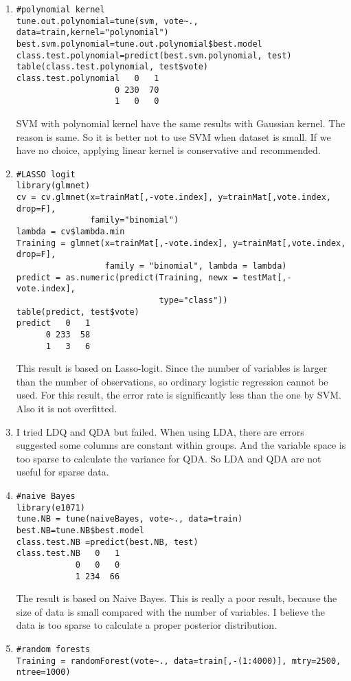 \documentclass[11pt,english]{article}
\begin{document}
\begin{enumerate}
\begin{enumerate}
\item
\begin{verbatim}
#polynomial kernel
tune.out.polynomial=tune(svm, vote~., data=train,kernel="polynomial")
best.svm.polynomial=tune.out.polynomial$best.model
class.test.polynomial=predict(best.svm.polynomial, test)
table(class.test.polynomial, test$vote)
class.test.polynomial   0   1
                    0 230  70
                    1   0   0
\end{verbatim}
SVM with polynomial kernel have the same results with Gaussian kernel.  The reason is same.  So it is better not to use SVM when dataset is small.  If we have no choice, applying linear kernel is conservative and recommended.
\item
\begin{verbatim}
#LASSO logit
library(glmnet)
cv = cv.glmnet(x=trainMat[,-vote.index], y=trainMat[,vote.index, drop=F],
               family="binomial")
lambda = cv$lambda.min
Training = glmnet(x=trainMat[,-vote.index], y=trainMat[,vote.index, drop=F],
                  family = "binomial", lambda = lambda)
predict = as.numeric(predict(Training, newx = testMat[,-vote.index],
                             type="class"))
table(predict, test$vote)
predict   0   1
      0 233  58
      1   3   6
\end{verbatim}
This result is based on Lasso-logit.  Since the number of variables is larger than the number of observations, so ordinary logistic regression cannot be used.  For this result, the error rate is significantly less than the one by SVM.   Also it is not overfitted.
\item
I tried LDQ and QDA but failed.  When using LDA, there are errors suggested some columns are constant within groups.  And the variable space is too sparse to calculate the variance for QDA.  So LDA and QDA are not useful for sparse data.
\item
\begin{verbatim}
#naive Bayes
library(e1071)
tune.NB = tune(naiveBayes, vote~., data=train)
best.NB=tune.NB$best.model
class.test.NB =predict(best.NB, test)
class.test.NB   0   1
            0   0   0
            1 234  66
\end{verbatim}
The result is based on Naive Bayes. This is really a poor result, because the size of data is small compared with the number of variables. I believe the data is too sparse to calculate a proper posterior distribution.
\item
\begin{verbatim}
#random forests
Training = randomForest(vote~., data=train[,-(1:4000)], mtry=2500, ntree=1000)

\end{verbatim}
\end{enumerate}
\end{enumerate}
\end{document}
